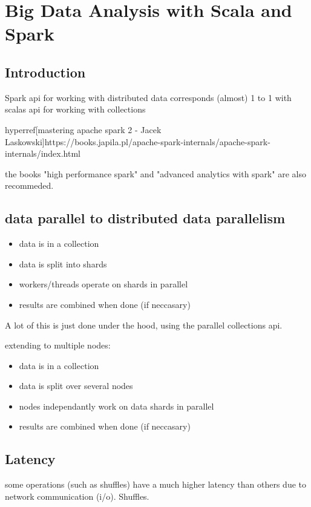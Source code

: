 \chapter{Big Data Analysis with Scala and Spark}

\section{Introduction}
Spark api for working with distributed data corresponds (almost) 1 to 1 with scalas api for working with collections

hyperref[mastering apache spark 2 - Jacek Laskowski]{https://books.japila.pl/apache-spark-internals/apache-spark-internals/index.html}

the books "high performance spark" and "advanced analytics with spark" are also recommeded.


\section{data parallel to distributed data parallelism}

\begin{itemize}
	\item data is in a collection
	\item data is split into shards
	\item workers/threads operate on shards in parallel
	\item results are combined when done (if neccasary)
\end{itemize}

A lot of this is just done under the hood, using the parallel collections api.

extending to multiple nodes:
\begin{itemize}
	\item data is in a collection
	\item data is split over several nodes
	\item nodes independantly work on data shards in parallel
	\item results are combined when done (if neccasary)
\end{itemize}

\section{Latency}


some operations (such as shuffles) have a much higher latency than others due to network communication (i/o). Shuffles. 


